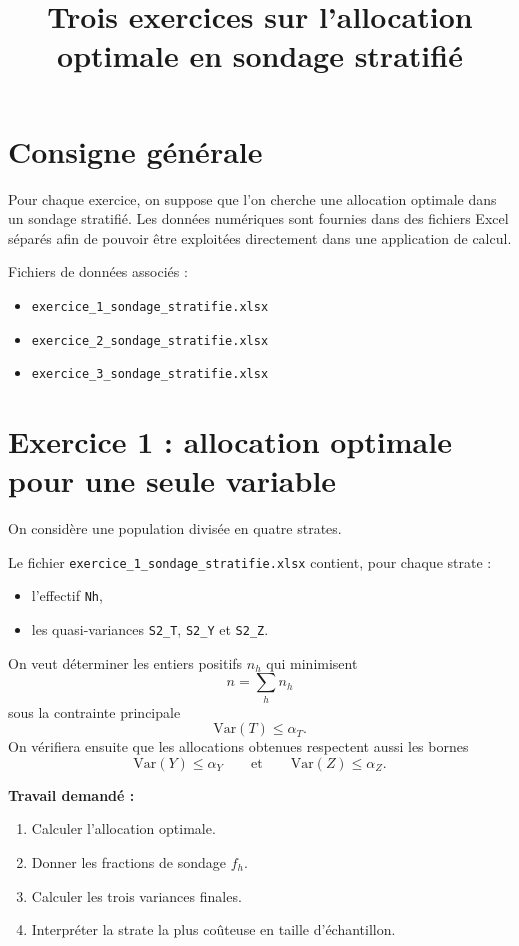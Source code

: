 \documentclass[11pt,a4paper]{article}
\title{Trois exercices sur l'allocation optimale en sondage stratifié}
\author{}
\date{}
\begin{document}
\maketitle

\section*{Consigne générale}
Pour chaque exercice, on suppose que l'on cherche une allocation optimale dans un sondage stratifié.  
Les données numériques sont fournies dans des fichiers Excel séparés afin de pouvoir être exploitées directement dans une application de calcul.

\bigskip
\noindent Fichiers de données associés :
\begin{itemize}[leftmargin=2em]
    \item \texttt{exercice\_1\_sondage\_stratifie.xlsx}
    \item \texttt{exercice\_2\_sondage\_stratifie.xlsx}
    \item \texttt{exercice\_3\_sondage\_stratifie.xlsx}
\end{itemize}

\section{Exercice 1 : allocation optimale pour une seule variable}
On considère une population divisée en quatre strates.

Le fichier \texttt{exercice\_1\_sondage\_stratifie.xlsx} contient, pour chaque strate :
\begin{itemize}[leftmargin=2em]
    \item l'effectif \texttt{Nh},
    \item les quasi-variances \texttt{S2\_T}, \texttt{S2\_Y} et \texttt{S2\_Z}.
\end{itemize}

On veut déterminer les entiers positifs $n_h$ qui minimisent
\[
n = \sum_h n_h
\]
sous la contrainte principale
\[
\mathrm{Var}(T) \leq \alpha_T.
\]
On vérifiera ensuite que les allocations obtenues respectent aussi les bornes
\[
\mathrm{Var}(Y) \leq \alpha_Y
\qquad \text{et} \qquad
\mathrm{Var}(Z) \leq \alpha_Z.
\]

\textbf{Travail demandé :}
\begin{enumerate}[leftmargin=2em]
    \item Calculer l'allocation optimale.
    \item Donner les fractions de sondage $f_h$.
    \item Calculer les trois variances finales.
    \item Interpréter la strate la plus coûteuse en taille d'échantillon.
\end{enumerate}
\end{document}
